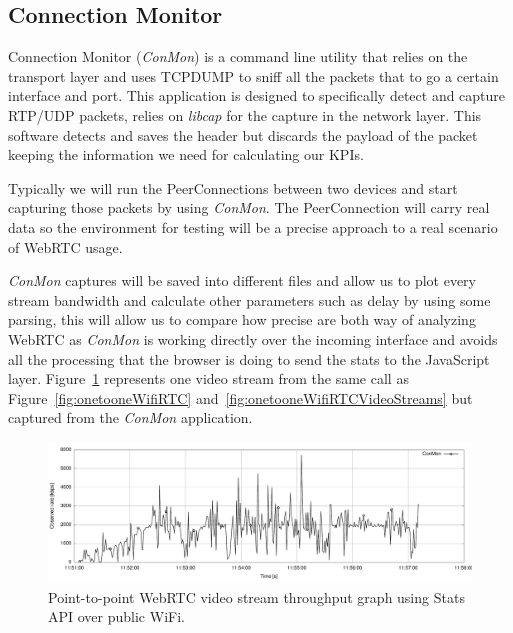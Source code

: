 \subsection{Connection Monitor}

Connection Monitor ({\it ConMon}) is a command line utility that relies on the transport layer and uses TCPDUMP to sniff all the packets that to go a certain interface and port. This application is designed to specifically detect and capture RTP/UDP packets, relies on {\it libcap} for the capture in the network layer. This software detects and saves the header but discards the payload of the packet keeping the information we need for calculating our KPIs.

Typically we will run the PeerConnections between two devices and start capturing those packets by using {\it ConMon}. The PeerConnection will carry real data so the environment for testing will be a precise approach to a real scenario of WebRTC usage.

{\it ConMon} captures will be saved into different files and allow us to plot every stream bandwidth and calculate other parameters such as delay by using some parsing, this will allow us to compare how precise are both way of analyzing WebRTC as {\it ConMon} is working directly over the incoming interface and avoids all the processing that the browser is doing to send the stats to the JavaScript layer. Figure~\ref{fig:onetooneWifiRTCConMon} represents one video stream from the same call as Figure~\ref{fig:onetooneWifiRTC} and~\ref{fig:onetooneWifiRTCVideoStreams} but captured from the {\it ConMon} application.

 \begin{figure}[h]
  \centering
    \includegraphics[width=1\textwidth]{./figures/onetooneWiFiConMon.pdf}
      \caption[Point-to-point WebRTC video stream throughput graph using Stats API over public WiFi]{Point-to-point WebRTC video stream throughput graph using Stats API over public WiFi.}
	\label{fig:onetooneWifiRTCConMon}
\end{figure}

